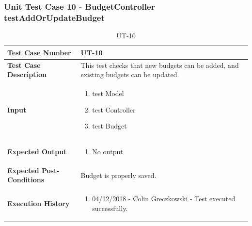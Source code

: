 \documentclass[12pt]{article}
\begin{document}
\subsubsection{Unit Test Case 10 - BudgetController testAddOrUpdateBudget}
\def\arraystretch{1.5}%
\begin{table}[htbp]
\centering
\caption{UT-10}
\label{UT-10}
\begin{tabularx}{\textwidth}{ | l | X |}
\hline
\textbf{Test Case Number}      		&  UT-10                 			\\ \hline
\textbf{Test Case Description}    	&  This test checks that new budgets can be added, and existing budgets can be updated.                				\\ \hline
\textbf{Input}         			& 	\begin{enumerate}
								\item test Model
								\item test Controller
								\item test Budget
							\end{enumerate} 		\\ \hline
\textbf{Expected Output}     		& 	\begin{enumerate}
								\item No output 
							\end{enumerate} 		\\ \hline
\textbf{Expected Post-Conditions}	& Budget is properly saved.                				\\ \hline
\textbf{Execution History}   		&  	\begin{enumerate}
								\item 04/12/2018 - Colin Greczkowski - Test executed successfully.
							\end {enumerate} \\ \hline
\end{tabularx}
\end{table}
\clearpage
\end{document}
